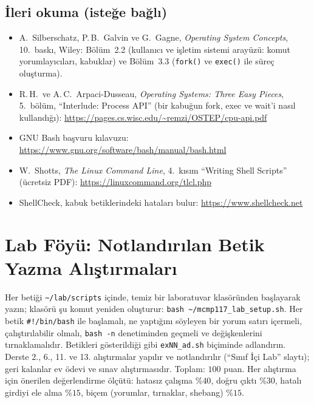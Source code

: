 \documentclass[11pt,a4paper]{article}
\newcommand{\cmd}[1]{\texttt{#1}}
\begin{document}
\subsection*{İleri okuma (isteğe bağlı)}
\begin{itemize}
  \item A.\ Silberschatz, P.\,B.\ Galvin ve G.\ Gagne, \emph{Operating System Concepts}, 10.\ baskı, Wiley: Bölüm~2.2 (kullanıcı ve işletim sistemi arayüzü: komut yorumlayıcıları, kabuklar) ve Bölüm~3.3 (\texttt{fork()} ve \texttt{exec()} ile süreç oluşturma).
  \item R.\,H.\ ve A.\,C.\ Arpaci-Dusseau, \emph{Operating Systems: Three Easy Pieces}, 5.~bölüm, “Interlude: Process API” (bir kabuğun fork, exec ve wait'i nasıl kullandığı): \url{https://pages.cs.wisc.edu/~remzi/OSTEP/cpu-api.pdf}
  \item GNU Bash başvuru kılavuzu: \url{https://www.gnu.org/software/bash/manual/bash.html}
  \item W.\ Shotts, \emph{The Linux Command Line}, 4.~kısım “Writing Shell Scripts” (ücretsiz PDF): \url{https://linuxcommand.org/tlcl.php}
  \item ShellCheck, kabuk betiklerindeki hataları bulur: \url{https://www.shellcheck.net}
\end{itemize}

\section{Lab Föyü: Notlandırılan Betik Yazma Alıştırmaları}

Her betiği \texttt{\textasciitilde/lab/scripts} içinde, temiz bir laboratuvar klasöründen başlayarak yazın; klasörü şu komut yeniden oluşturur: \cmd{bash \textasciitilde/mcmp117\_lab\_setup.sh}. Her betik \texttt{\#!/bin/bash} ile başlamalı, ne yaptığını söyleyen bir yorum satırı içermeli, çalıştırılabilir olmalı, \cmd{bash -n} denetiminden geçmeli ve değişkenlerini tırnaklamalıdır. Betikleri gösterildiği gibi \texttt{exNN\_ad.sh} biçiminde adlandırın. Derste 2., 6., 11. ve 13. alıştırmalar yapılır ve notlandırılır (“Sınıf İçi Lab” slaytı); geri kalanlar ev ödevi ve sınav alıştırmasıdır. Toplam: $100$ puan. Her alıştırma için önerilen değerlendirme ölçütü: hatasız çalışma \%$40$, doğru çıktı \%$30$, hatalı girdiyi ele alma \%$15$, biçem (yorumlar, tırnaklar, shebang) \%$15$.
\end{document}

